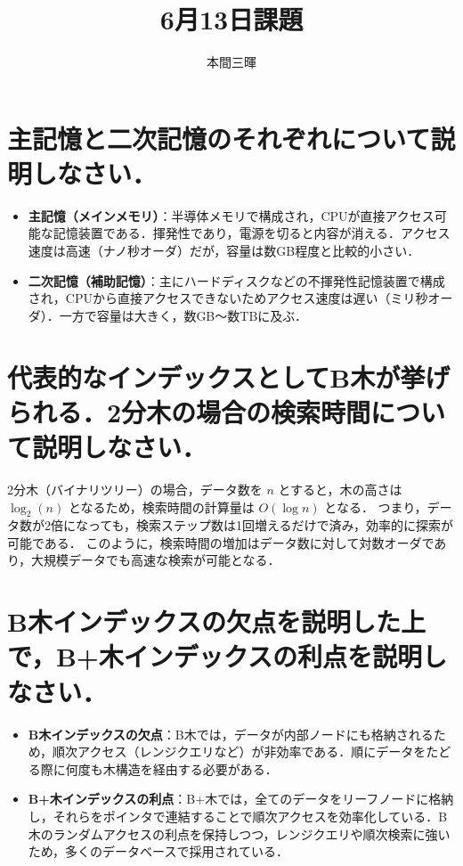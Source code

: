 \documentclass[titlepage,a4paper]{jsarticle}
\title{6月13日課題}
\author{本間三暉}
\begin{document}
\maketitle
\section{主記憶と二次記憶のそれぞれについて説明しなさい．}
\begin{itemize}
  \item \textbf{主記憶（メインメモリ）}：半導体メモリで構成され，CPUが直接アクセス可能な記憶装置である．揮発性であり，電源を切ると内容が消える．アクセス速度は高速（ナノ秒オーダ）だが，容量は数GB程度と比較的小さい．
  \item \textbf{二次記憶（補助記憶）}：主にハードディスクなどの不揮発性記憶装置で構成され，CPUから直接アクセスできないためアクセス速度は遅い（ミリ秒オーダ）．一方で容量は大きく，数GB〜数TBに及ぶ．
\end{itemize}

\section{代表的なインデックスとしてB木が挙げられる．2分木の場合の検索時間について説明しなさい．}
2分木（バイナリツリー）の場合，データ数を $n$ とすると，木の高さは $\log_2(n)$ となるため，検索時間の計算量は $O(\log n)$ となる．  
つまり，データ数が2倍になっても，検索ステップ数は1回増えるだけで済み，効率的に探索が可能である．  
このように，検索時間の増加はデータ数に対して対数オーダであり，大規模データでも高速な検索が可能となる．

\section{B木インデックスの欠点を説明した上で，B+木インデックスの利点を説明しなさい．}
\begin{itemize}
  \item \textbf{B木インデックスの欠点}：B木では，データが内部ノードにも格納されるため，順次アクセス（レンジクエリなど）が非効率である．順にデータをたどる際に何度も木構造を経由する必要がある．
  \item \textbf{B+木インデックスの利点}：B+木では，全てのデータをリーフノードに格納し，それらをポインタで連結することで順次アクセスを効率化している．B木のランダムアクセスの利点を保持しつつ，レンジクエリや順次検索に強いため，多くのデータベースで採用されている．
\end{itemize}
\end{document}
